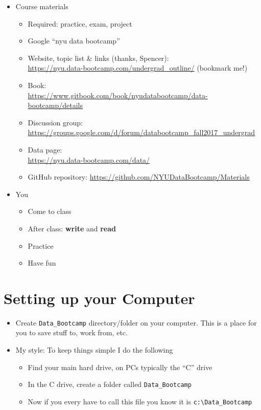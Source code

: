 \begin{itemize}
\item Course materials
\begin{itemize}
\item Required:  practice, exam, project
\item Google ``nyu data bootcamp''
\item Website, topic list \& links  (thanks, Spencer):\\ \url{https://nyu.data-bootcamp.com/undergrad_outline/}  (bookmark me!)
\item Book: \\ \url{https://www.gitbook.com/book/nyudatabootcamp/data-bootcamp/details}
\item Discussion group: \\ \url{https://groups.google.com/d/forum/databootcamp_fall2017_undergrad}
\item Data page: \\
\url{https://nyu.data-bootcamp.com/data/}
\item GitHub repository:  \url{https://github.com/NYUDataBootcamp/Materials}
\end{itemize}

\item You
\begin{itemize}
\item Come to class
\item After class:  {\bf write} and {\bf read}
\item Practice
\item Have fun
\end{itemize}
\end{itemize}

\section*{Setting up your Computer}
\begin{itemize}
\item Create \verb|Data_Bootcamp| directory/folder on your computer. This is a place for you to save stuff to, work from, etc.
\item My style: To keep things simple I do the following
\begin{itemize}
\item Find your main hard drive, on PCs typically the ``C'' drive
\item In the C drive, create a folder called \verb|Data_Bootcamp|
\item Now if you every have to call this file you know it is \verb|c:\Data_Bootcamp|
\end{itemize}
\end{itemize}

